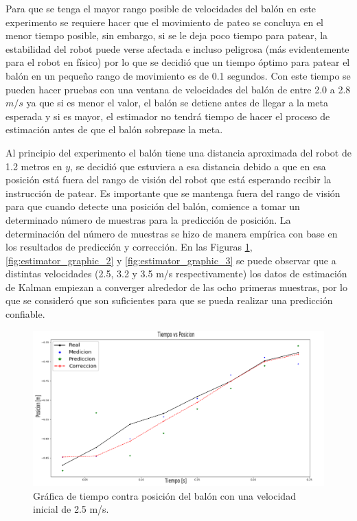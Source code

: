 	Para que se tenga el mayor rango posible de velocidades del balón en este experimento se requiere hacer que el movimiento de pateo se concluya en el menor tiempo posible, sin embargo, si se le deja poco tiempo para patear, la estabilidad del robot puede verse afectada e incluso peligrosa (más evidentemente para el robot en físico) por lo que se decidió que un tiempo óptimo para patear el balón en un pequeño rango de movimiento es de 0.1 segundos. Con este tiempo se pueden hacer pruebas con una ventana de velocidades del balón de entre 2.0 a 2.8 $m/s$ ya que si es menor el valor, el balón se detiene antes de llegar a la meta esperada y si es mayor, el estimador no tendrá tiempo de hacer el proceso de estimación antes de que el balón sobrepase la meta.
	
	Al principio del experimento el balón tiene una distancia aproximada del robot de 1.2 metros en $y$, se decidió que estuviera a esa distancia debido a que en esa posición está fuera del rango de visión del robot que está esperando recibir la instrucción de patear. Es importante que se mantenga fuera del rango de visión para que cuando detecte una posición del balón, comience a tomar un determinado número de muestras para la predicción de posición. La determinación del número de muestras se hizo de manera empírica con base en los resultados de predicción y corrección. 
	En las  Figuras \ref{fig:estimator_graphic_1}, \ref{fig:estimator_graphic_2} y \ref{fig:estimator_graphic_3} se puede observar que a distintas velocidades (2.5, 3.2 y 3.5 m/s respectivamente) los datos de estimación de Kalman empiezan a converger alrededor de las ocho primeras muestras, por lo que se consideró que son suficientes para que se pueda realizar una predicción confiable.	
	
\begin{figure}
\centering
	\includegraphics[scale=0.3]{images/test_vel_2dot5.png}
	\caption{Gráfica de tiempo contra posición del balón con una velocidad inicial de 2.5 m/s.}
\label{fig:estimator_graphic_1}
\end{figure}


